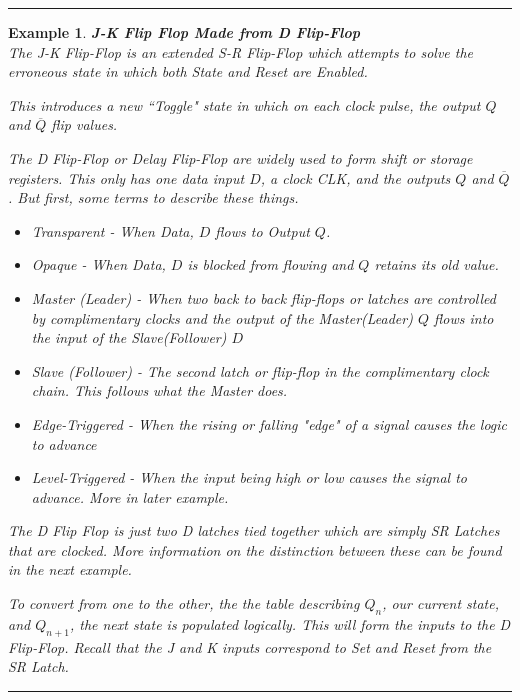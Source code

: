\documentclass[12pt]{article}
\newtheorem{example}{Example}
\newenvironment{examp}
{
	\vspace{.5cm}
	\hrule
\begin{example}\upshape}
	{\hrule
		\vspace{0.5cm}
\end{example}}
\begin{document}
\begin{examp}
\vspace{.5cm}
\textbf{J-K Flip Flop Made from D Flip-Flop}\\
The \textit{J-K Flip-Flop} is an extended \textit{S-R Flip-Flop} which
attempts to solve the erroneous state in which both State and Reset are
Enabled.

This introduces a new ``Toggle" state in which on each clock pulse, the output
\(Q\) and \(\overline{Q}\) flip values.

The \textit{D Flip-Flop} or \textit{Delay Flip-Flop} are widely used to form
shift or storage registers. This only has one data input \(D\), a clock CLK, and
the outputs \(Q\) and \(\overline{Q}\). But first, some terms to describe
these \textit{things}.
\begin{itemize}
	\item Transparent - When Data, \(D\) flows to Output \(Q\).
	\item Opaque - When Data, \(D\) is blocked from flowing and \(Q\) retains its
	      old value.
	\item Master (Leader) - When two back to back flip-flops or latches are
	      controlled by complimentary clocks and the output of the Master(Leader)
	      \(Q\) flows into the input of the Slave(Follower) \(D\)
	\item Slave (Follower) - The second latch or flip-flop in the complimentary clock
	      chain. This follows what the Master does.
	\item Edge-Triggered - When the rising or falling "edge" of a signal
	      causes the logic to advance
	\item Level-Triggered - When the input being high or low causes the signal
	      to advance. More in later example.
\end{itemize}
The D Flip Flop is just two D latches tied together which are simply SR
Latches that are clocked. More information on the distinction between these can
be found in the next example.

To convert from one to the other, the the table describing \(Q_n\), our
current state, and \(Q_{n+1}\), the next state is populated logically. This
will form the inputs to the D Flip-Flop. Recall that the J and K inputs
correspond to Set and Reset from the SR Latch.


\end{examp}
\end{document}
